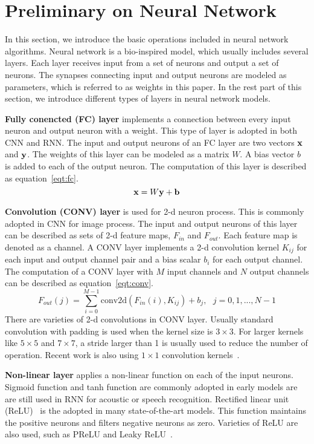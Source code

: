 \section{Preliminary on Neural Network}\label{sec:preliminary}

In this section, we introduce the basic operations included in neural network algorithms. Neural network is a bio-inspired model, which usually includes several layers. Each layer receives input from a set of neurons and output a set of neurons. The synapses connecting input and output neurons are modeled as parameters, which is referred to as weights in this paper. In the rest part of this section, we introduce different types of layers in neural network models.

{\bf{Fully conencted (FC) layer}} implements a connection between every input neuron and output neuron with a weight. This type of layer is adopted in both CNN and RNN. The input and output neurons of an FC layer are two vectors $\bf{x}$ and $\bf{y}$. The weights of this layer can be modeled as a matrix $W$. A bias vector $b$ is added to each of the output neuron. The computation of this layer is described as equation~\ref{eqt:fc}.
\begin{equation}\label{eqt:fc}
    {\bf{x}} = W{\bf{y}} + {\bf{b}}
\end{equation}

{\bf{Convolution (CONV) layer}} is used for 2-d neuron process. This is commonly adopted in CNN for image process. The input and output neurons of this layer can be described as sets of 2-d feature maps, $F_{in}$ and $F_{out}$. Each feature map is denoted as a channel. A CONV layer implements a 2-d convolution kernel $K_{ij}$ for each input and output channel pair and a bias scalar $b_i$ for each output channel. The computation of a CONV layer with $M$ input channels and $N$ output channels can be described as equation~\ref{eqt:conv}.
\begin{equation}\label{eqt:conv}
    F_{out}(j) = \sum_{i=0}^{M-1} \text{conv2d}(F_{in}(i), K_{ij}) + b_j, \text{      } j=0,1,...,N-1
\end{equation}
There are varieties of 2-d convolutions in CONV layer. Usually standard convolution with padding is used when the kernel size is $3\times 3$. For larger kernels like $5\times 5$ and $7\times 7$, a stride larger than 1 is usually used to reduce the number of operation. Recent work is also using $1\times 1$ convolution kernels~\cite{he2016deep, iandola2016squeezenet}.

{\bf{Non-linear layer}} applies a non-linear function on each of the input neurons. Sigmoid function and tanh function are commonly adopted in early models are are still used in RNN for acoustic or speech recognition. Rectified linear unit (ReLU)~\cite{krizhevsky2012imagenet} is the adopted in many state-of-the-art models. This function maintains the positive neurons and filters negative neurons as zero. Varieties of ReLU are also used, such as PReLU and Leaky ReLU~\cite{xu2015empirical}.

